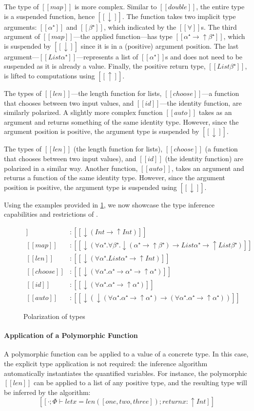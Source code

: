 The type of $[[map]]$ is more complex. Similar to $[[double]]$, the
entire type is a suspended function, hence $[[↓]]$. The function takes two implicit type
arguments: $[[α⁺]]$ and $[[β⁺]]$, which indicated by the $[[∀]]$s.
The third argument of $[[map]]$---the applied function---has type $[[α⁺ → ↑β⁺]]$,
which is suspended by $[[↓]]$ since it is in a (positive) argument position. 
The last argument---$[[List α⁺]]$---represents a list of $[[α⁺]]$s and does not need
to be suspended as it is already a value. Finally, the positive return type,
$[[List β⁺]]$, is lifted to computations using $[[↑]]$.

The types of $[[len]]$---the length function for lists, $[[choose]]$---a
function that chooses between two input values, and $[[id]]$---the identity
function, are similarly polarized. A slightly more complex function $[[auto]]$
takes as an argument and returns something of the same identity type. However,
since the argument position is positive, the argument type is suspended by
$[[↓]]$.

The types of $[[len]]$ (the length function for lists), $[[choose]]$ (a function
that chooses between two input values), and $[[id]]$ (the identity function) are
polarized in a similar way. Another function, $[[auto]]$, takes an argument and returns
a function of the same identity type. However, since the argument position is
positive, the argument type is suspended using $[[↓]]$.

Using the examples provided in \cref{fig:polarization-examples}, we now showcase 
the type inference capabilities and restrictions of \fexists.

\begin{figure}[t]
  \begin{align*}
    [[double]] &: [[↓(Int → ↑Int)]] \\
    [[map]] &: [[↓(∀α⁺.∀β⁺.↓(α⁺ → ↑β⁺) → List α⁺ → ↑List β⁺)]] \\
    [[len]] &: [[↓(∀α⁺.List α⁺ → ↑Int)]] \\
    [[choose]] &: [[↓(∀α⁺.α⁺ → α⁺ → ↑α⁺)]] \\
    [[id]] &: [[↓(∀α⁺.α⁺ → ↑α⁺)]] \\
    [[auto]] &: [[↓(↓(∀α⁺.α⁺ → ↑α⁺) → (∀α⁺.α⁺ → ↑α⁺))]]
  \end{align*}
  \caption{Polarization of \systemf types}
  \label{fig:polarization-examples}
\end{figure}

\paragraph*{Application of a Polymorphic Function}
  A polymorphic function can be applied to a value of a concrete type. In this
  case, the explicit type application is not required: the inference algorithm
  automatically instantiates the quantified variables. For instance, the
  polymorphic $[[len]]$ can be applied to a list of any positive type, and the
  resulting type will be inferred by the algorithm:
  $$[[· ; Φ ⊢ let x = len([one,two,three]); return x : ↑Int]]$$

